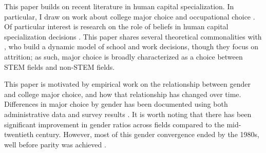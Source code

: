 





This paper builds on recent literature in human capital specialization.
In particular, I draw on work about college major choice and occupational choice \parencite{ABM12,AAM16-education}.
Of particular interest is research on the role of beliefs in human capital specialization decisions \parencite{AHMR-wp}.
This paper shares several theoretical commonalities with \textcite{AAMR16-wp}, who build a dynamic model of school and work decisions, though they focus on attrition; as such, major choice is broadly characterized as a choice between STEM fields and non-STEM fields. 

This paper is motivated by empirical work on the relationship between gender and college major choice, and how that relationship has changed over time.
Differences in major choice by gender has been documented using both administrative data \parencite{D10} and survey results \parencite{Z13}.
It is worth noting that there has been significant improvement in gender ratios across fields compared to the mid-twentieth century.
However, most of this gender convergence ended by the 1980s, well before parity was achieved \parencite{SHB19,EL06}. 

